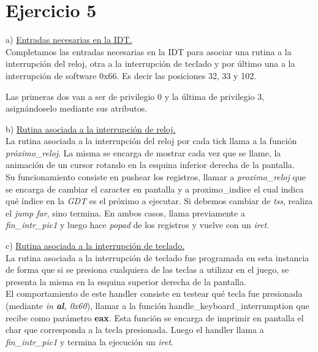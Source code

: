 \documentclass[a4paper]{article}
\begin{document}
\newpage
\section{Ejercicio 5}

{\large a)} \underline{Entradas necesarias en la IDT.}\\

Completamos las entradas necesarias en la IDT para asociar una rutina a la interrupci\'on del
reloj, otra a la interrupci\'on de teclado y por \'ultimo una a la interrupci\'on de software 0x66. Es decir las posiciones 32, 33 y 102.

Las primeras dos van a ser de privilegio 0 y la \'ultima de privilegio 3, asign\'andoselo mediante sus atributos.\\

\bigskip

{\large b)} \underline{Rutina asociada a la interrupci\'on de reloj.}\\

La rutina asociada a la interrupci\'on del reloj por cada tick llama a la funci\'on \textit{pr\'oximo_reloj}. La misma se encarga de mostrar cada vez que se llame, la animaci\'on de un cursor rotando en la esquina inferior derecha de la pantalla. \\

Su funcionamiento consiste en pushear los registros, llamar a \textit{proximo_reloj} que se encarga de cambiar el caracter en pantalla y a proximo_indice el cual indica qu\'e \'indice en la \emph{GDT} es el pr\'oximo a ejecutar. Si debemos cambiar de \emph{tss}, realiza el \textit{jump far}, sino termina. En ambos casos, llama previamente a \\
\textit{fin_intr_pic1} y luego hace \textit{popad} de los registros y vuelve con un \textit{iret}.\\
\bigskip

{\large c)} \underline{Rutina asociada a la interrupci\'on de teclado.}\\

La rutina asociada a la interrupci\'on de teclado fue programada en esta instancia de forma que si se presiona cualquiera de las teclas a utilizar en el juego, se presenta la misma en la esquina superior derecha de la pantalla. \\

El comportamiento de este handler consiste en testear qu\'e tecla fue presionada (mediante \textit{in \textbf{al}, 0x60}), llamar a la funci\'on handle_keyboard_interrumption que recibe como par\'ametro \textbf{eax}. Esta funci\'on se encarga de imprimir en pantalla el char que corresponda a la tecla presionada. Luego el handler llama a \textit{fin_intr_pic1} y termina la ejecuci\'on un \textit{iret}. \\
\end{document}
